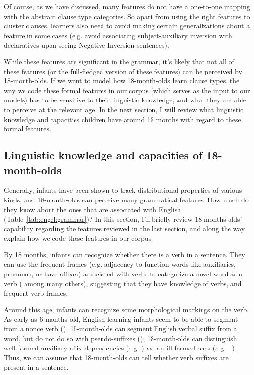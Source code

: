 Of course, as we have discussed, many features do not have a one-to-one mapping with the abstract clause type categories. So apart from using the right features to cluster clauses, learners also need to avoid making certain generalizations about a feature in some cases (e.g. avoid associating subject-auxiliary inversion with declaratives upon seeing Negative Inversion sentences).  
 
While these features are significant in the grammar, it's likely that not all of these features (or the full-fledged version of these features) can be perceived by 18-month-olds. If we want to model how 18-month-olds learn clause types, the way we code these formal features in our corpus (which serves as the input to our models) has to be sensitive to their linguistic knowledge, and what they are able to perceive at the relevant age. In the next section, I will review what linguistic knowledge and capacities children have around 18 months with regard to these formal features. 

\subsection{Linguistic knowledge and capacities of 18-month-olds}
\label{sec:engcl:bg:assumptions}

Generally, infants have been shown to track distributional properties of various kinds, and 18-month-olds can perceive many grammatical features. How much do they know about the ones that are associated with English \diis{} (Table~\ref{tab:engcl:grammar})? In this section, I'll briefly review 18-months-olds' capability regarding the features reviewed in the last section, and along the way explain how we code these features in our corpus. %

 By 18 months, infants can recognize whether there is a verb in a sentence. They can use the frequent frames (e.g. adjacency to function words like auxiliaries, pronouns, or have affixes) associated with verbs to categorize a novel word as a verb (\cite{echols2004verb, mintz2006verb,peterson2006aux,soderstrom2007sv, lidzoritaomaki2012, shi2014functional, helidz2017verb} among many others), suggesting that they have knowledge of verbs, and frequent verb frames. 

 Around this age, infants can recognize some morphological markings on the verb.  As early as 6 months old, English-learning infants seem to be able to segment  from a nonce verb (\cite{kimmegha2016morph}). 15-month-olds can segment English verbal suffix  from a word, but do not do so with pseudo-suffixes (\cite{mintz2013segmentation}); 18-month-olds can distinguish well-formed auxiliary-affix dependencies (e.g. ) vs. an ill-formed ones (e.g. , \cite{santelmann1998morph}). Thus, we can assume that 18-month-olds can tell whether verb suffixes are present in a sentence.

